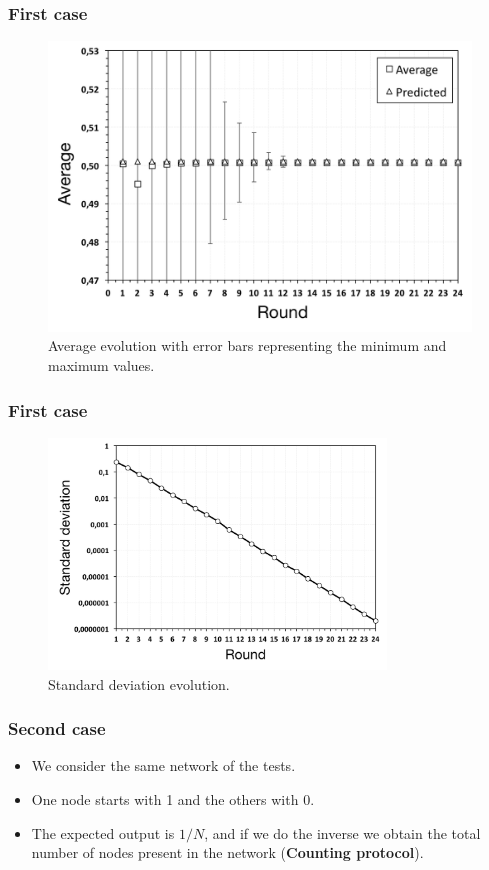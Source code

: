 \documentclass{beamer}
\begin{document}
\begin{frame}
\frametitle{First case}
    
\begin{figure}[p]
\centering
\includegraphics[keepaspectratio=true, width=0.8\linewidth]{images/aggregation_average}
\caption{Average evolution with error bars representing the minimum and maximum values.}
\label{fig:aggregation_average}
\end{figure}
\end{frame}

\begin{frame}
\frametitle{First case}
    
\begin{figure}[p]
\centering
\includegraphics[keepaspectratio=true, width=0.8\textwidth]{images/aggregation_standard_deviation}
\caption{Standard deviation evolution.}
\label{fig:aggregation_standard_deviation}
\end{figure}

\end{frame}

\begin{frame}
\frametitle{Second case}

\begin{itemize}
  \item We consider the same network of the tests.
  \item One node starts with 1 and the others with 0.
  \item The expected output is $1/N$, and if we do the inverse we obtain the total number of nodes present in the network (\textbf{Counting protocol}).
\end{itemize}
\end{frame}
\end{document}
